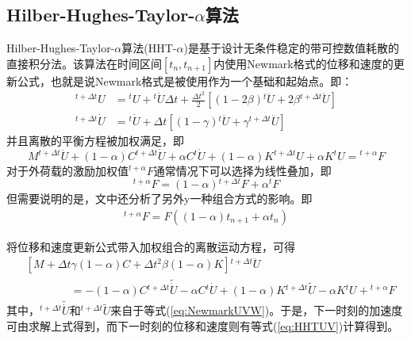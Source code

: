 \subsection{Hilber-Hughes-Taylor-$\alpha$算法}
Hilber-Hughes-Taylor-$\alpha$算法(HHT-$\alpha$)\cite{Hilber1977}是基于设计无条件稳定的带可控数值耗散的直接积分法。该算法在时间区间$[t_n,t_{n+1}]$内使用Newmark格式的位移和速度的更新公式，也就是说Newmark格式是被使用作为一个基础和起始点。即：
\begin{subequations}
\begin{align}
{^{t+\Delta t}\!{U}}&={^t\!U}+{^t\!\dot{U}}\Delta t+\frac{\Delta t^2}{2}[(1-2\beta){^t\!\ddot{U}}+2\beta{^{t+\Delta t}\!\ddot{U}}]\\
{^{t+\Delta t}\!\dot{U}}&={^t\!\dot{U}}+\Delta t[(1-\gamma){^t\!\ddot{U}}+\gamma{^{t+\Delta t}\!\ddot{U}}]
\end{align}\label{eq:HHTUV}
\end{subequations}
并且离散的平衡方程被加权满足，即
\begin{equation}
M{^{t+\Delta t}\!\ddot{U}}+(1-\alpha)C{^{t+\Delta t}\!\dot{U}}+\alpha C{^{t}\!\dot{U}}+(1-\alpha)K{^{t+\Delta t}\!U}+\alpha K{^t\!U}={^{t+\alpha}\!F}
\end{equation}
对于外荷载的激励加权值${^{t+\alpha}\!F}$通常情况下可以选择为线性叠加，即
\begin{equation}
{^{t+\alpha}\!F}=(1-\alpha){^{t+\Delta t}\!F}+\alpha{^t\!F}
\end{equation}
但需要说明的是，文中还分析了另外y一种组合方式的影响。即
\begin{align}
{^{t+\alpha}\!F}=F((1-\alpha)t_{n+1}+\alpha t_n)
\end{align}

将位移和速度更新公式带入加权组合的离散运动方程，可得
\begin{equation}
\begin{split}
&\left[M+\Delta t\gamma(1-\alpha)C+\Delta t^2\beta(1-\alpha)K\right]{^{t+\Delta t}\!\ddot{U}}\\
&\qquad\qquad=-(1-\alpha)C{^{t+\Delta t}\!\widetilde{\dot{U}}}-\alpha C{^t\!\dot{U}}+(1-\alpha)K{^{t+\Delta t}\!\widetilde{U}}-\alpha K{^t\!U}+{^{t+\alpha}\!F}
\end{split}
\end{equation}
其中，${^{t+\Delta t}\!\widetilde{\dot{U}}}$和${^{t+\Delta t}\!\widetilde{U}}$来自于等式(\ref{eq:NewmarkUVW})。于是，下一时刻的加速度可由求解上式得到，而下一时刻的位移和速度则有等式(\ref{eq:HHTUV})计算得到。

